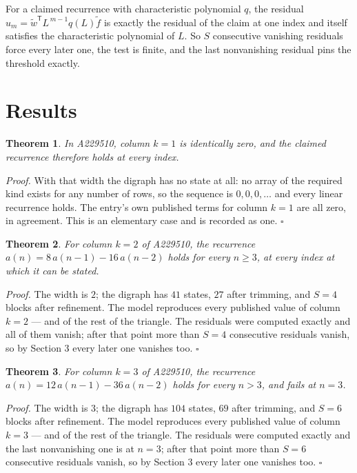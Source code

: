 \documentclass[11pt]{article}
\newtheorem{theorem}{Theorem}
\theoremstyle{definition}
\begin{document}
For a claimed recurrence with characteristic polynomial $q$, the residual $u_m = \tilde w^{\mathsf T}L^{\,m-1}q(L)\tilde f$ is exactly the residual of the claim at one index and itself satisfies the characteristic polynomial of $L$. So $S$ consecutive vanishing residuals force every later one, the test is finite, and the last nonvanishing residual pins the threshold exactly.

\section{Results}

\begin{theorem} In A229510, column $k = 1$ is identically zero, and the claimed recurrence therefore holds at every index.\end{theorem}

{\itshape Proof.} With that width the digraph has no state at all: no array of the required kind exists for any number of rows, so the sequence is $0,0,0,\dots$ and every linear recurrence holds. The entry's own published terms for column $k = 1$ are all zero, in agreement. This is an elementary case and is recorded as one. $\square$

\begin{theorem} For column $k = 2$ of A229510, the recurrence $a(n) = 8\,a(n-1) - 16\,a(n-2)$ holds for every $n \ge 3$, at every index at which it can be stated.\end{theorem}

{\itshape Proof.} The width is $2$; the digraph has $41$ states, $27$ after trimming, and $S = 4$ blocks after refinement. The model reproduces every published value of column $k = 2$ --- and of the rest of the triangle. The residuals were computed exactly and all of them vanish; after that point more than $S = 4$ consecutive residuals vanish, so by Section 3 every later one vanishes too. $\square$

\begin{theorem} For column $k = 3$ of A229510, the recurrence $a(n) = 12\,a(n-1) - 36\,a(n-2)$ holds for every $n > 3$, and fails at $n = 3$.\end{theorem}

{\itshape Proof.} The width is $3$; the digraph has $104$ states, $69$ after trimming, and $S = 6$ blocks after refinement. The model reproduces every published value of column $k = 3$ --- and of the rest of the triangle. The residuals were computed exactly and the last nonvanishing one is at $n = 3$; after that point more than $S = 6$ consecutive residuals vanish, so by Section 3 every later one vanishes too. $\square$
\end{document}
